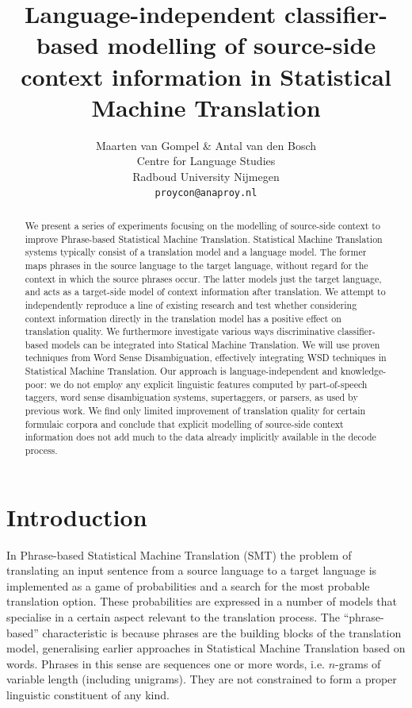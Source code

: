 \documentclass[smallextended]{svjour3}       %
\title{Language-independent classifier-based modelling of source-side context information in Statistical Machine Translation}
\author{Maarten van Gompel \& Antal van den Bosch \\
  Centre for Language Studies \\
  Radboud University Nijmegen \\
  {\tt proycon@anaproy.nl}}
\theoremstyle{break}
\begin{document}
\maketitle

\begin{abstract} 
  We present a series of experiments focusing on the modelling of
  source-side context to improve Phrase-based Statistical Machine
  Translation. Statistical Machine Translation systems typically
  consist of a translation model and a language model. The former maps
  phrases in the source language to the target language, without
  regard for the context in which the source phrases occur. The latter
  models just the target language, and acts as a target-side model of
  context information after translation. We attempt to independently
  reproduce a line of existing research and test whether considering
  context information directly in the translation model has a positive
  effect on translation quality.  We furthermore investigate various
  ways discriminative classifier-based models can be integrated into
  Statical Machine Translation.  We will use proven techniques from
  Word Sense Disambiguation, effectively integrating WSD techniques in
  Statistical Machine Translation. Our approach is
  language-independent and knowledge-poor: we do not employ any
  explicit linguistic features computed by part-of-speech taggers,
  word sense disambiguation systems, supertaggers, or parsers, as used
  by previous work. We find only limited improvement of translation quality for
  certain formulaic corpora and conclude that explicit modelling of source-side
  context information does not add much to the data already implicitly
  available in the decode process.
\end{abstract}

\section{Introduction}

In Phrase-based Statistical Machine Translation (SMT) the problem of
translating an input sentence from a source language to a target language is
implemented as a game of probabilities and a search for the most probable
translation option.  These probabilities are expressed in a number of models
that specialise in a certain aspect relevant to the translation process. The
``phrase-based'' characteristic is because phrases are the building blocks of
the translation model, generalising earlier approaches in
Statistical Machine Translation based on words.  Phrases in this
sense are sequences one or more words, i.e. $n$-grams of variable
length (including unigrams). They are not constrained to form a
proper linguistic constituent of any kind.
\end{document}

